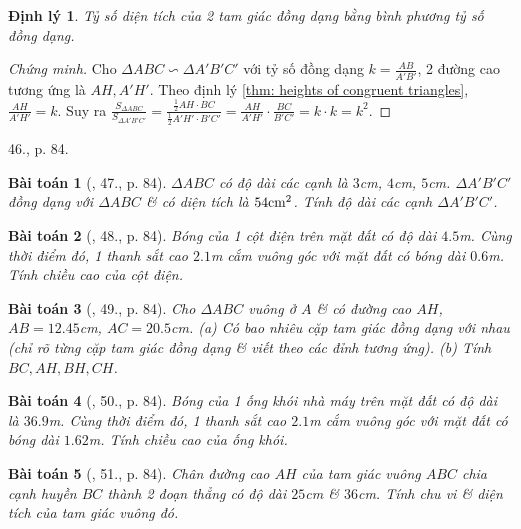 \documentclass{article}
\newtheorem{baitoan}{Bài toán}
\newtheorem{dinhly}{Định lý}
\begin{document}
\begin{dinhly}
	Tỷ số diện tích của 2 tam giác đồng dạng bằng bình phương tỷ số đồng dạng.
\end{dinhly}

\begin{proof}[Chứng minh]
	Cho $\Delta ABC\backsim\Delta A'B'C'$ với tỷ số đồng dạng $k = \frac{AB}{A'B'}$, 2 đường cao tương ứng là $AH,A'H'$. Theo định lý \ref{thm: heights of congruent triangles}, $\frac{AH}{A'H'} = k$. Suy ra $\frac{S_{\Delta ABC}}{S_{\Delta A'B'C'}} = \frac{\frac{1}{2}AH\cdot BC}{\frac{1}{2}A'H'\cdot B'C'} = \frac{AH}{A'H'}\cdot\frac{BC}{B'C'} = k\cdot k = k^2$.
\end{proof}
46., p. 84.

\begin{baitoan}[\cite{SGK_Toan_8_tap_2}, 47., p. 84]
	$\Delta ABC$ có độ dài các cạnh là $3$\emph{cm}, $4$\emph{cm}, $5$\emph{cm}. $\Delta A'B'C'$ đồng dạng với $\Delta ABC$ \& có diện tích là $54{\rm cm}^2$. Tính độ dài các cạnh $\Delta A'B'C'$.
\end{baitoan}

\begin{baitoan}[\cite{SGK_Toan_8_tap_2}, 48., p. 84]
	Bóng của 1 cột điện trên mặt đất có độ dài $4.5$\emph{m}. Cùng thời điểm đó, 1 thanh sắt cao $2.1$\emph{m} cắm vuông góc với mặt đất có bóng dài $0.6$\emph{m}. Tính chiều cao của cột điện.
\end{baitoan}

\begin{baitoan}[\cite{SGK_Toan_8_tap_2}, 49., p. 84]
	Cho $\Delta ABC$ vuông ở $A$ \& có đường cao $AH$, $AB = 12.45$\emph{cm}, $AC = 20.5$\emph{cm}. (a) Có bao nhiêu cặp tam giác đồng dạng với nhau (chỉ rõ từng cặp tam giác đồng dạng \& viết theo các đỉnh tương ứng). (b) Tính $BC,AH,BH,CH$.
\end{baitoan}

\begin{baitoan}[\cite{SGK_Toan_8_tap_2}, 50., p. 84]
	Bóng của 1 ống khói nhà máy trên mặt đất có độ dài là $36.9$\emph{m}. Cùng thời điểm đó, 1 thanh sắt cao $2.1$\emph{m} cắm vuông góc với mặt đất có bóng dài $1.62$\emph{m}. Tính chiều cao của ống khói.
\end{baitoan}

\begin{baitoan}[\cite{SGK_Toan_8_tap_2}, 51., p. 84]
	Chân đường cao $AH$ của tam giác vuông $ABC$ chia cạnh huyền $BC$ thành 2 đoạn thẳng có độ dài $25$\emph{cm} \& $36$\emph{cm}. Tính chu vi \& diện tích của tam giác vuông đó.
\end{baitoan}
\end{document}
